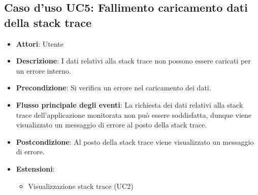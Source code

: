 \subsection{Caso d'uso UC5: Fallimento caricamento dati della stack trace }
\begin{itemize}
\item \textbf{Attori}: Utente
\item \textbf{Descrizione}: I dati relativi alla stack trace non possono essere caricati per un errore interno.
\item \textbf{Precondizione}: Si verifica un errore nel caricamento dei dati.
\item \textbf{Flusso principale degli eventi}: La richiesta dei dati relativi alla stack trace dell'applicazione monitorata non può essere soddisfatta, dunque viene visualizzato un messaggio di errore al posto della stack trace.
\item \textbf{Postcondizione}: Al posto della stack trace viene visualizzato un messaggio di errore.
\item \textbf{Estensioni}:
\begin{itemize}
\item Visualizzazione stack trace (UC2)
\end{itemize}
\end{itemize}
